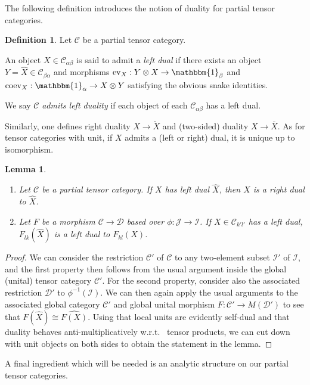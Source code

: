 \documentclass[11pt]{article}
\newcommand{\CatC}{\mathcal{C}}
\newcommand{\CatD}{\mathcal{D}}
\newcommand{\CatCC}{\mathscr{C}}
\newcommand{\CatDD}{\mathscr{D}}
\newcommand{\ev}{\mathrm{ev}}
\newcommand{\coev}{\mathrm{coev}}
\newcommand{\Unitb}{\mathbbm{1}}
\newtheorem{Lem}[Theorem]{Lemma}
\theoremstyle{definition}
\newtheorem{Def}[Theorem]{Definition}
\numberwithin{equation}{section}
\begin{document}
The following definition introduces the notion of duality for partial tensor categories.

\begin{Def} Let $\CatCC$ be a partial tensor category. 

An object $X\in \CatC_{\alpha\beta}$ is said to admit a \emph{left dual} if there exists an object $Y=\hat{X} \in \CatC_{\beta\alpha}$ and morphisms $\ev_{X}: Y\otimes X \rightarrow \Unitb_\beta$ and $\coev_X: \Unitb_\alpha\rightarrow X\otimes Y$ satisfying the obvious snake identities.

We say $\CatCC$ \emph{admits left duality} if each object of each $\CatC_{\alpha\beta}$ has a left dual.
\end{Def}

Similarly, one defines right duality $X\rightarrow \check{X}$ and (two-sided) duality $X\rightarrow \bar{X}$. As for tensor categories with unit, if $X$ admits a (left or right) dual, it is unique up to isomorphism. 

\begin{Lem}\label{LemMorDua}
\begin{enumerate}
\item Let $\CatCC$ be a partial tensor category. If $X$ has left dual $\hat{X}$, then $X$ is a right dual to $\hat{X}$. 
\item Let $F$ be a morphism $\CatCC\rightarrow \CatDD$ based over $\phi:\mathscr{J}\rightarrow \mathscr{I}$. If $X\in \CatC_{k'l'}$ has a left dual, $F_{lk}(\hat{X})$ is a left dual to $F_{kl}(X)$.
 \end{enumerate}
\end{Lem}
\begin{proof}
We can consider the restriction $\CatCC'$ of $\CatCC$ to any two-element subset $\mathscr{I}'$ of $\mathscr{I}$, and the first property then follows from the usual argument inside the global (unital) tensor category $\CatCC'$. For the second property, consider also the associated restriction $\mathscr{D}'$ to $\phi^{-1}(\mathscr{I})$. We can then again apply the usual arguments to the associated global category $\CatC'$ and global unital morphism $F:\CatC'\rightarrow M(\CatD')$ to see that $F(\hat{X})\cong \widehat{F(X)}$. Using that local units are evidently self-dual and that duality behaves anti-multiplicatively w.r.t.~ tensor products, we can cut down with unit objects on both sides to obtain the statement in the lemma.
\end{proof}

A final ingredient which will be needed is an analytic structure on our partial tensor categories.
\end{document}
